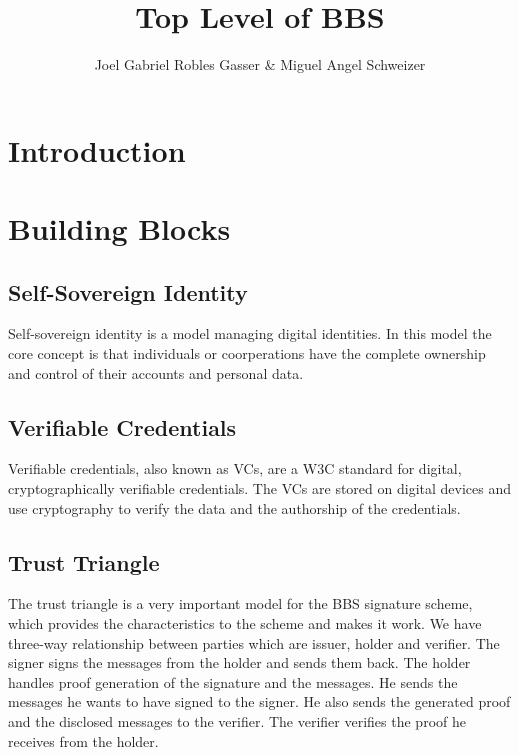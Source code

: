 \documentclass{article}
\title{Top Level of BBS}
\author{Joel Gabriel Robles Gasser \& Miguel Angel Schweizer}
\begin{document}
\maketitle

\begin{abstract}
\end{abstract}

\section{Introduction}


\section{Building Blocks}

\subsection{Self-Sovereign Identity}

Self-sovereign identity is a model managing digital identities. In this model the core concept is that individuals or coorperations have the complete ownership and control of their accounts and personal data.

\subsection{Verifiable Credentials}

Verifiable credentials, also known as VCs, are a W3C standard for digital, cryptographically verifiable credentials. The VCs are stored on digital devices and use cryptography to verify the data and the authorship of the credentials.

\subsection{Trust Triangle}

The trust triangle is a very important model for the BBS signature scheme, which provides the characteristics to the scheme and makes it work. 
We have three-way relationship between parties which are issuer, holder and verifier. 
The signer signs the messages from the holder and sends them back.
The holder handles proof generation of the signature and the messages. He sends the messages he wants to have signed to the signer. He also sends the generated proof and the disclosed messages to the verifier.
The verifier verifies the proof he receives from the holder.
\end{document}
